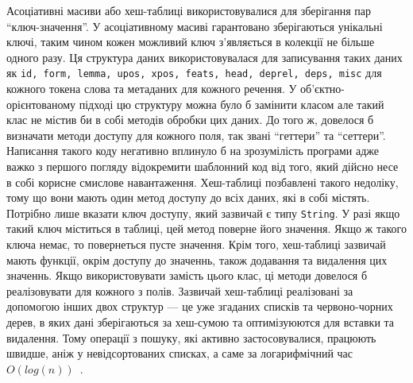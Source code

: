 Асоціативні масиви або хеш-таблиці використовувалися для зберігання пар ``ключ-значення''.
У асоціативному масиві гарантовано зберігаються унікальні ключі, таким чином кожен 
можливий ключ з’являється в колекції не більше одного разу. Ця структура даних
використовувалася для записування таких даних як \texttt{id, form, lemma, upos, xpos,
feats, head, deprel, deps, misc} для кожного токена слова та метаданих для кожного
речення. У об'єктно-орієнтованому підході цю структуру
можна було б замінити класом але такий клас не містив би в собі
методів обробки цих даних. До того ж, довелося б визначати методи доступу для кожного
поля, так звані ``геттери'' та ``сеттери''. Написання такого коду негативно
вплинуло б на зрозумілість програми адже важко з першого погляду відокремити
шаблонний код від того, який дійсно несе в собі корисне смислове навантаження.
Хеш-таблиці позбавлені такого недоліку, тому що вони мають один метод доступу
до всіх даних, які в собі містять. Потрібно лише вказати ключ доступу, який зазвичай
є типу \texttt{String}. У разі якщо такий ключ міститься в таблиці, цей метод поверне
його значення. Якщо ж такого ключа немає, то повернеться пусте значення. Крім того,
хеш-таблиці зазвичай мають функції, окрім доступу до значеннь, також додавання
та видалення цих значеннь. Якщо використовувати замість цього клас, ці методи довелося б
реалізовувати для кожного з полів. Зазвичай хеш-таблиці реалізовані за допомогою
інших двох структур --- це уже згаданих списків та червоно-чорних дерев, в яких дані
зберігаються за хеш-сумою та оптимізуюются для вставки та видалення. Тому операції
з пошуку, які активно застосовувалися, працюють швидше, аніж у невідсортованих
списках, а саме за логарифмічний час $O(log(n))$~\cite{bib14}.

